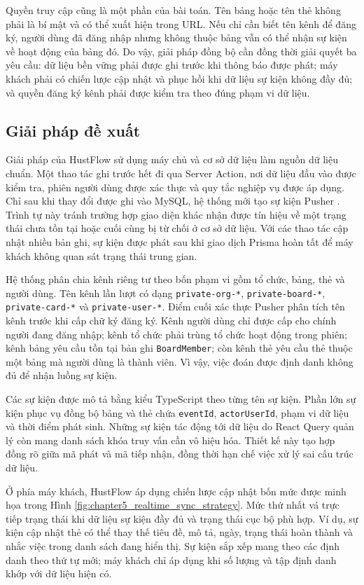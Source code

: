 \documentclass[../DoAn.tex]{subfiles}
\begin{document}
Quyền truy cập cũng là một phần của bài toán. Tên bảng hoặc tên thẻ không phải là bí mật và có thể xuất hiện trong URL. Nếu chỉ cần biết tên kênh để đăng ký, người dùng đã đăng nhập nhưng không thuộc bảng vẫn có thể nhận sự kiện về hoạt động của bảng đó. Do vậy, giải pháp đồng bộ cần đồng thời giải quyết ba yêu cầu: dữ liệu bền vững phải được ghi trước khi thông báo được phát; máy khách phải có chiến lược cập nhật và phục hồi khi dữ liệu sự kiện không đầy đủ; và quyền đăng ký kênh phải được kiểm tra theo đúng phạm vi dữ liệu.

\subsection{Giải pháp đề xuất}
\label{subsection:5.1.2}

Giải pháp của HustFlow sử dụng máy chủ và cơ sở dữ liệu làm nguồn dữ liệu chuẩn. Một thao tác ghi trước hết đi qua Server Action, nơi dữ liệu đầu vào được kiểm tra, phiên người dùng được xác thực và quy tắc nghiệp vụ được áp dụng. Chỉ sau khi thay đổi được ghi vào MySQL, hệ thống mới tạo sự kiện Pusher \cite{pusher}. Trình tự này tránh trường hợp giao diện khác nhận được tín hiệu về một trạng thái chưa tồn tại hoặc cuối cùng bị từ chối ở cơ sở dữ liệu. Với các thao tác cập nhật nhiều bản ghi, sự kiện được phát sau khi giao dịch Prisma hoàn tất để máy khách không quan sát trạng thái trung gian.

Hệ thống phân chia kênh riêng tư theo bốn phạm vi gồm tổ chức, bảng, thẻ và người dùng. Tên kênh lần lượt có dạng \texttt{private-org-*}, \texttt{private-board-*}, \texttt{private-card-*} và \texttt{private-user-*}. Điểm cuối xác thực Pusher phân tích tên kênh trước khi cấp chữ ký đăng ký. Kênh người dùng chỉ được cấp cho chính người đang đăng nhập; kênh tổ chức phải trùng tổ chức hoạt động trong phiên; kênh bảng yêu cầu tồn tại bản ghi \texttt{BoardMember}; còn kênh thẻ yêu cầu thẻ thuộc một bảng mà người dùng là thành viên. Vì vậy, việc đoán được định danh không đủ để nhận luồng sự kiện.

Các sự kiện được mô tả bằng kiểu TypeScript theo từng tên sự kiện. Phần lớn sự kiện phục vụ đồng bộ bảng và thẻ chứa \texttt{eventId}, \texttt{actorUserId}, phạm vi dữ liệu và thời điểm phát sinh. Những sự kiện tác động tới dữ liệu do React Query quản lý còn mang danh sách khóa truy vấn cần vô hiệu hóa. Thiết kế này tạo hợp đồng rõ giữa mã phát và mã tiếp nhận, đồng thời hạn chế việc xử lý sai cấu trúc dữ liệu.

Ở phía máy khách, HustFlow áp dụng chiến lược cập nhật bốn mức được minh họa trong Hình \ref{fig:chapter5_realtime_sync_strategy}. Mức thứ nhất vá trực tiếp trạng thái khi dữ liệu sự kiện đầy đủ và trạng thái cục bộ phù hợp. Ví dụ, sự kiện cập nhật thẻ có thể thay thế tiêu đề, mô tả, ngày, trạng thái hoàn thành và nhắc việc trong danh sách đang hiển thị. Sự kiện sắp xếp mang theo các định danh theo thứ tự mới; máy khách chỉ áp dụng khi số lượng và tập định danh khớp với dữ liệu hiện có.
\end{document}
